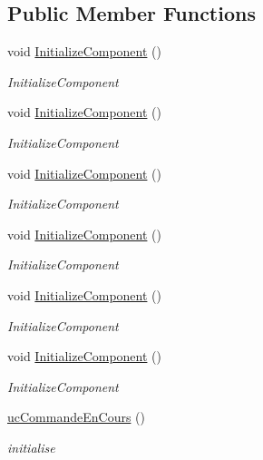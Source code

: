 \subsection*{Public Member Functions}
\begin{DoxyCompactItemize}
\item 
void \hyperlink{classnewPizza1_1_1ucCommandeEnCours_a5838b3aa1f180eda285120814af5dadd}{Initialize\+Component} ()
\begin{DoxyCompactList}\small\item\em Initialize\+Component \end{DoxyCompactList}\item 
void \hyperlink{classnewPizza1_1_1ucCommandeEnCours_a5838b3aa1f180eda285120814af5dadd}{Initialize\+Component} ()
\begin{DoxyCompactList}\small\item\em Initialize\+Component \end{DoxyCompactList}\item 
void \hyperlink{classnewPizza1_1_1ucCommandeEnCours_a5838b3aa1f180eda285120814af5dadd}{Initialize\+Component} ()
\begin{DoxyCompactList}\small\item\em Initialize\+Component \end{DoxyCompactList}\item 
void \hyperlink{classnewPizza1_1_1ucCommandeEnCours_a5838b3aa1f180eda285120814af5dadd}{Initialize\+Component} ()
\begin{DoxyCompactList}\small\item\em Initialize\+Component \end{DoxyCompactList}\item 
void \hyperlink{classnewPizza1_1_1ucCommandeEnCours_a5838b3aa1f180eda285120814af5dadd}{Initialize\+Component} ()
\begin{DoxyCompactList}\small\item\em Initialize\+Component \end{DoxyCompactList}\item 
void \hyperlink{classnewPizza1_1_1ucCommandeEnCours_a5838b3aa1f180eda285120814af5dadd}{Initialize\+Component} ()
\begin{DoxyCompactList}\small\item\em Initialize\+Component \end{DoxyCompactList}\item 
\hyperlink{classnewPizza1_1_1ucCommandeEnCours_a4076cbc30b75ea9e7894c9688668f616}{uc\+Commande\+En\+Cours} ()
\begin{DoxyCompactList}\small\item\em initialise \end{DoxyCompactList}\end{DoxyCompactItemize}
